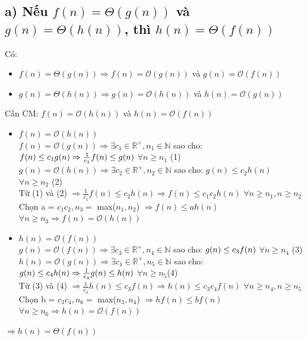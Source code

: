 \documentclass[10pt,a4paper]{article}
\begin{document}
\subsection*{a) Nếu $f(n) = \Theta(g(n))$ và $g(n) = \Theta(h(n))$, thì $h(n) = \Theta(f(n))$}
Có:
\begin{itemize}
    \item $f(n) = \Theta(g(n)) \Rightarrow f(n) = \mathcal{O}(g(n))$ và $g(n) = \mathcal{O}(f(n))$
    \item $g(n) = \Theta(h(n)) \Rightarrow g(n) = \mathcal{O}(h(n))$ và $h(n) = \mathcal{O}(g(n))$
\end{itemize}
Cần CM: $f(n) = \mathcal{O}(h(n))$ và $h(n) = \mathcal{O}(f(n))$
\begin{itemize}
    \item $f(n) = \mathcal{O}(h(n))$\\
    $f(n) = \mathcal{O}(g(n)) \Rightarrow \exists c_1 \in \mathbb{R^+}, n_1 \in \mathbb{N}$ sao cho: $f(n) \leq c_1g(n)\\ \Rightarrow \frac{1}{c_1}f(n) \leq g(n)$ $\forall n \geq n_1$ (1)\\
    $g(n) = \mathcal{O}(h(n)) \Rightarrow \exists c_2 \in \mathbb{R^+}, n_2 \in \mathbb{N}$ sao cho: $g(n) \leq c_2h(n)$ $\forall n \geq n_2$ (2)\\
    Từ (1) và (2) $\Rightarrow \frac{1}{c_1}f(n) \leq c_2h(n) \Rightarrow f(n) \leq c_1c_2h(n)$ $\forall n \geq n_1, n \geq n_2$\\
    Chọn a = $c_1c_2, n_3 =$ max($n_1, n_2$) $\Rightarrow f(n) \leq ah(n)$  $\forall n \geq n_3 \Rightarrow f(n) = \mathcal{O}(h(n))$
    \item $h(n) = \mathcal{O}(f(n))$\\
    $g(n) = \mathcal{O}(f(n)) \Rightarrow \exists c_3 \in \mathbb{R^+}, n_4 \in \mathbb{N}$ sao cho: $g(n) \leq c_3f(n)\\$ $\forall n \geq n_4$ (3)\\
    $h(n) = \mathcal{O}(g(n)) \Rightarrow \exists c_4 \in \mathbb{R^+}, n_5 \in \mathbb{N}$ sao cho: $g(n) \leq c_4h(n) \\ \Rightarrow \frac{1}{c_4}g(n) \leq h(n)$ $\forall n \geq n_5$(4)\\
    Từ (3) và (4) $\Rightarrow \frac{1}{c_4}h(n) \leq c_3f(n) \Rightarrow h(n) \leq c_3c_4f(n)$ $\forall n \geq n_4, n \geq n_5$\\
    Chọn b = $c_3c_4, n_6 =$ max($n_3, n_4$) $\Rightarrow hf(n) \leq bf(n)$  $\forall n \geq n_6 \Rightarrow h(n) = \mathcal{O}(f(n))$
\end{itemize}
$\Rightarrow h(n) = \Theta(f(n))$ \\
\end{document}
